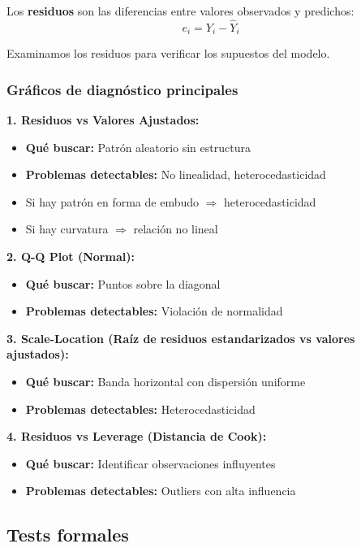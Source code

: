 \documentclass[11pt,a4paper]{article}
\begin{document}
Los \textbf{residuos} son las diferencias entre valores observados y predichos:
\begin{equation}
e_i = Y_i - \hat{Y}_i
\end{equation}

Examinamos los residuos para verificar los supuestos del modelo.

\subsubsection{Gráficos de diagnóstico principales}

\textbf{1. Residuos vs Valores Ajustados:}
\begin{itemize}
    \item \textbf{Qué buscar:} Patrón aleatorio sin estructura
    \item \textbf{Problemas detectables:} No linealidad, heterocedasticidad
    \item Si hay patrón en forma de embudo $\Rightarrow$ heterocedasticidad
    \item Si hay curvatura $\Rightarrow$ relación no lineal
\end{itemize}

\textbf{2. Q-Q Plot (Normal):}
\begin{itemize}
    \item \textbf{Qué buscar:} Puntos sobre la diagonal
    \item \textbf{Problemas detectables:} Violación de normalidad
\end{itemize}

\textbf{3. Scale-Location (Raíz de residuos estandarizados vs valores ajustados):}
\begin{itemize}
    \item \textbf{Qué buscar:} Banda horizontal con dispersión uniforme
    \item \textbf{Problemas detectables:} Heterocedasticidad
\end{itemize}

\textbf{4. Residuos vs Leverage (Distancia de Cook):}
\begin{itemize}
    \item \textbf{Qué buscar:} Identificar observaciones influyentes
    \item \textbf{Problemas detectables:} Outliers con alta influencia
\end{itemize}

\subsection{Tests formales}
\end{document}
